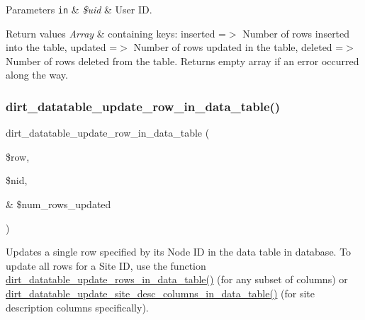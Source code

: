 \begin{DoxyParams}[1]{Parameters}
\mbox{\tt in}  & {\em \$uid} & User ID.\\
\hline
\end{DoxyParams}

\begin{DoxyRetVals}{Return values}
{\em Array} & containing keys\+: \textquotesingle{}inserted\textquotesingle{} =$>$ Number of rows inserted into the table, \textquotesingle{}updated\textquotesingle{} =$>$ Number of rows updated in the table, \textquotesingle{}deleted\textquotesingle{} =$>$ Number of rows deleted from the table. Returns empty array if an error occurred along the way. \\
\hline
\end{DoxyRetVals}
\mbox{\label{dirt__datatable_8search__table__db__ops_8inc_a3401406781a9ffeba3d49396922ebd4a}} 
\subsubsection{\texorpdfstring{dirt\+\_\+datatable\+\_\+update\+\_\+row\+\_\+in\+\_\+data\+\_\+table()}{dirt\_datatable\_update\_row\_in\_data\_table()}}
{\footnotesize\ttfamily dirt\+\_\+datatable\+\_\+update\+\_\+row\+\_\+in\+\_\+data\+\_\+table (\begin{DoxyParamCaption}\item[{}]{\$row,  }\item[{}]{\$nid,  }\item[{\&}]{\$num\+\_\+rows\+\_\+updated }\end{DoxyParamCaption})}

Updates a single row specified by its Node ID in the data table in database. To update all rows for a Site ID, use the function \mbox{\hyperlink{dirt__datatable_8search__table__db__ops_8inc_a56d526f6ad807d4803b1380894f34e21}{dirt\+\_\+datatable\+\_\+update\+\_\+rows\+\_\+in\+\_\+data\+\_\+table()}} (for any subset of columns) or \mbox{\hyperlink{dirt__datatable_8search__table__db__ops_8inc_a7c062b4f66744b92eaa5b07548650d59}{dirt\+\_\+datatable\+\_\+update\+\_\+site\+\_\+desc\+\_\+columns\+\_\+in\+\_\+data\+\_\+table()}} (for site description columns specifically).


